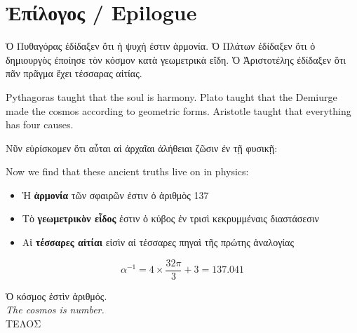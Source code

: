 \documentclass[12pt,a4paper]{article}
\newcommand{\gk}[1]{\textgreek{#1}}
\begin{document}

\section{\gk{Ἐπίλογος} / Epilogue}

\gk{Ὁ Πυθαγόρας ἐδίδαξεν ὅτι ἡ ψυχὴ ἐστιν ἁρμονία. Ὁ Πλάτων ἐδίδαξεν ὅτι ὁ δημιουργὸς ἐποίησε τὸν κόσμον κατὰ γεωμετρικὰ εἴδη. Ὁ Ἀριστοτέλης ἐδίδαξεν ὅτι πᾶν πρᾶγμα ἔχει τέσσαρας αἰτίας.}

Pythagoras taught that the soul is harmony. Plato taught that the Demiurge made the cosmos according to geometric forms. Aristotle taught that everything has four causes.

\vspace{0.5em}
\gk{Νῦν εὑρίσκομεν ὅτι αὗται αἱ ἀρχαῖαι ἀλήθειαι ζῶσιν ἐν τῇ φυσικῇ:}

Now we find that these ancient truths live on in physics:

\begin{itemize}
\item \gk{Ἡ \textbf{ἁρμονία} τῶν σφαιρῶν ἐστιν ὁ ἀριθμὸς 137}
\item \gk{Τὸ \textbf{γεωμετρικὸν εἶδος} ἐστιν ὁ κύβος ἐν τρισὶ κεκρυμμέναις διαστάσεσιν}
\item \gk{Αἱ \textbf{τέσσαρες αἰτίαι} εἰσὶν αἱ τέσσαρες πηγαὶ τῆς πρώτης ἀναλογίας}
\end{itemize}

\begin{equation}
\boxed{\alpha^{-1} = 4 \times \frac{32\pi}{3} + 3 = 137.041}
\end{equation}

\vspace{1em}
\begin{center}
\gk{Ὁ κόσμος ἐστὶν ἀριθμός.}\\[0.3em]
\textit{The cosmos is number.}\\[1em]
\Large\gk{ΤΕΛΟΣ}
\end{center}
\end{document}
